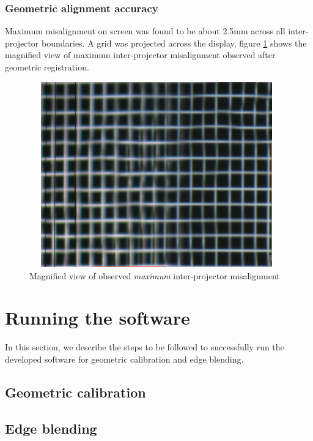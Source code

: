 \documentclass{article}
\begin{document}
\subsubsection{Geometric alignment accuracy}
Maximum misalignment on screen was found to be about 2.5mm across all inter-projector boundaries. A grid was projected across the display, figure \ref{misalign} shows the magnified view of maximum inter-projector misalignment observed after geometric registration.

\begin{figure}
\includegraphics[width=11cm,height=8cm]{figures/misalign_1.png}
\caption{Magnified view of observed \textit{maximum} inter-projector misalignment}
\label{misalign}
\end{figure}



\section{Running the software}
In this section, we describe the steps to be followed to successfully run the developed software for geometric calibration and edge blending.
\subsection{Geometric calibration}

\subsection{Edge blending}



    
\end{document}

